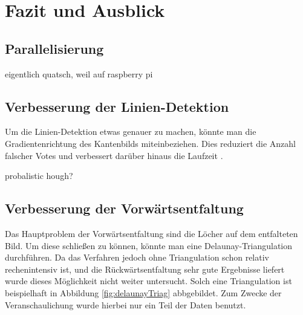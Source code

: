 \chapter{Fazit und Ausblick}
\label{ch:summary}

\section{Parallelisierung}

eigentlich quatsch, weil auf raspberry pi

\section{Verbesserung der Linien-Detektion}
Um die Linien-Detektion etwas genauer zu machen, könnte man die Gradientenrichtung des Kantenbilds miteinbeziehen. Dies reduziert die Anzahl falscher Votes und verbessert darüber hinaus die Laufzeit \cite{Gorman1976}. 

probalistic hough?

\section{Verbesserung der Vorwärtsentfaltung}
Das Hauptproblem der Vorwärtsentfaltung sind die Löcher auf dem entfalteten Bild. Um diese schließen zu können, könnte man eine Delaunay-Triangulation durchführen. 
Da das Verfahren jedoch ohne Triangulation schon relativ rechenintensiv ist, und die Rückwärtsentfaltung sehr gute Ergebnisse liefert wurde dieses Möglichkeit nicht weiter untersucht.
Solch eine Triangulation ist beispielhaft in Abbildung \ref{fig:delaunayTriag} abbgebildet. Zum Zwecke der Veranschaulichung wurde hierbei nur ein Teil der Daten benutzt.

